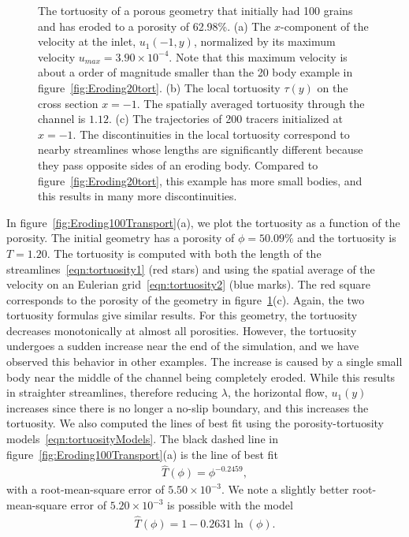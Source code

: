 \documentclass{jfm}
\begin{document}
\begin{figure}
\begin{subfigure}[b]{0.5\textwidth}
\caption{}
\end{subfigure}
\caption{\label{fig:Eroding100tort} The tortuosity of a porous geometry
that initially had 100 grains and has eroded to a porosity of 62.98\%.
(a) The $x$-component of the velocity at the inlet, $u_1(-1, y)$,
normalized by its maximum velocity $u_{max}=3.90 \times 10^{-4}$.  Note
that this maximum velocity is about a order of magnitude smaller than
the 20 body example in figure~\ref{fig:Eroding20tort}.  (b) The local
tortuosity $\tau(y)$ on the cross section $x = -1$. The spatially
averaged tortuosity through the channel is $1.12$. (c) The trajectories
of 200 tracers initialized at $x = -1$.  The discontinuities in the
local tortuosity correspond to nearby streamlines whose lengths are
significantly different because they pass opposite sides of an eroding
body. Compared to figure~\ref{fig:Eroding20tort}, this example has more
small bodies, and this results in many more discontinuities.}
\end{figure}

In figure~\ref{fig:Eroding100Transport}(a), we plot the tortuosity as a
function of the porosity.  The initial geometry has a porosity of $\phi
= 50.09\%$ and the tortuosity is $T = 1.20$.  The tortuosity is computed
with both the length of the streamlines~\eqref{eqn:tortuosity1} (red
stars) and using the spatial average of the velocity on an Eulerian
grid~\eqref{eqn:tortuosity2} (blue marks).  The red square corresponds
to the porosity of the geometry in figure~\ref{fig:Eroding100tort}(c).
Again, the two tortuosity formulas give similar results.  For this
geometry, the tortuosity decreases monotonically at almost all
porosities.  However, the tortuosity undergoes a sudden increase near
the end of the simulation, and we have observed this behavior in other
examples.  The increase is caused by a single small body near the middle
of the channel being completely eroded.  While this results in
straighter streamlines, therefore reducing $\lambda$, the horizontal
flow, $u_1(y)$ increases since there is no longer a no-slip boundary,
and this increases the tortuosity.  We also computed the lines of best
fit using the porosity-tortuosity models~\eqref{eqn:tortuosityModels}.
The black dashed line in figure~\ref{fig:Eroding100Transport}(a) is the
line of best fit
\begin{align}
  \widehat{T}(\phi) = \phi^{-0.2459},
\end{align}
with a root-mean-square error of $5.50 \times 10^{-3}$.  We note a
slightly better root-mean-square error of $5.20 \times 10^{-3}$ is
possible with the model
\begin{align}
  \widehat{T}(\phi) = 1 - 0.2631 \ln(\phi).
\end{align}
\end{document}
